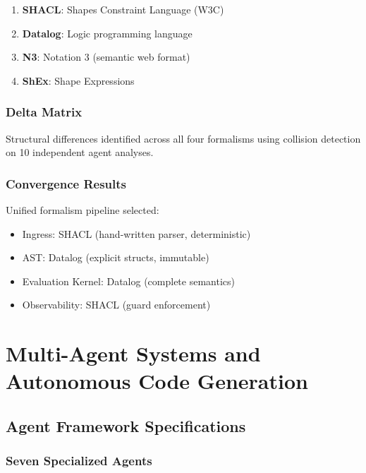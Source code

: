 \documentclass[12pt,oneside,a4paper]{book}
\theoremstyle{definition}
\begin{document}
\begin{enumerate}
  \item \textbf{SHACL}: Shapes Constraint Language (W3C)
  \item \textbf{Datalog}: Logic programming language
  \item \textbf{N3}: Notation 3 (semantic web format)
  \item \textbf{ShEx}: Shape Expressions
\end{enumerate}

\section{Delta Matrix}
\label{sec:epic14-delta}

Structural differences identified across all four formalisms using
collision detection on 10 independent agent analyses.

\section{Convergence Results}
\label{sec:epic14-synthesis}

Unified formalism pipeline selected:
\begin{itemize}
  \item Ingress: SHACL (hand-written parser, deterministic)
  \item AST: Datalog (explicit structs, immutable)
  \item Evaluation Kernel: Datalog (complete semantics)
  \item Observability: SHACL (guard enforcement)
\end{itemize}


\part{Multi-Agent Systems and Autonomous Code Generation}
\label{part:agents}

\chapter{Agent Framework Specifications}
\label{ch:agent-specs}


\section{Seven Specialized Agents}
\label{sec:seven-agents}
\end{document}
